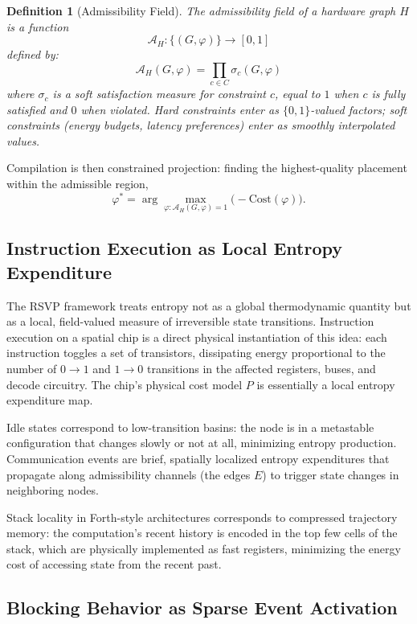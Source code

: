 \documentclass[11pt, a4paper]{article}
\newtheorem{definition}{Definition}
\begin{document}
\begin{definition}[Admissibility Field]
The admissibility field of a hardware graph $H$ is a function
\[
\mathcal{A}_H : \{(G, \varphi)\} \to [0, 1]
\]
defined by:
\[
\mathcal{A}_H(G, \varphi) = \prod_{c \in C} \sigma_c(G, \varphi)
\]
where $\sigma_c$ is a soft satisfaction measure for constraint $c$, equal to $1$ when
$c$ is fully satisfied and $0$ when violated. Hard constraints enter as $\{0,1\}$-valued
factors; soft constraints (energy budgets, latency preferences) enter as smoothly
interpolated values.
\end{definition}

Compilation is then constrained projection: finding the highest-quality placement within
the admissible region,
\[
\varphi^* = \arg\max_{\varphi : \mathcal{A}_H(G,\varphi) = 1} \bigl(-\text{Cost}(\varphi)\bigr).
\]

\subsection{Instruction Execution as Local Entropy Expenditure}

The RSVP framework treats entropy not as a global thermodynamic quantity but as a
local, field-valued measure of irreversible state transitions. Instruction execution
on a spatial chip is a direct physical instantiation of this idea: each instruction
toggles a set of transistors, dissipating energy proportional to the number of
$0 \to 1$ and $1 \to 0$ transitions in the affected registers, buses, and decode
circuitry. The chip's physical cost model $P$ is essentially a local entropy expenditure
map.

Idle states correspond to low-transition basins: the node is in a metastable
configuration that changes slowly or not at all, minimizing entropy production.
Communication events are brief, spatially localized entropy expenditures that propagate
along admissibility channels (the edges $E$) to trigger state changes in neighboring
nodes.

Stack locality in Forth-style architectures corresponds to compressed trajectory memory:
the computation's recent history is encoded in the top few cells of the stack, which
are physically implemented as fast registers, minimizing the energy cost of accessing
state from the recent past.

\subsection{Blocking Behavior as Sparse Event Activation}
\end{document}
